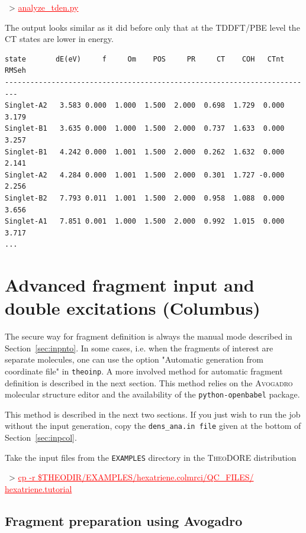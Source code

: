 \documentclass[DIV=12,headings=normal]{scrartcl}
\newcommand{\redl}[1]{{\textcolor{red}{\underline{#1}}}}
\newcommand{\comm}[1]{
\small
~> \redl{#1}
\normalsize
}
\newcommand{\theo}{\textsc{TheoDORE}}
\begin{document}
\comm{analyze\_tden.py}

The output looks similar as it did before only that at the TDDFT/PBE level the CT states are lower in energy.

\scriptsize
\begin{Verbatim}[commandchars=\\\{\}]
state       dE(eV)     f     Om    POS     PR     CT    COH   CTnt  RMSeh
-------------------------------------------------------------------------
Singlet-A2   3.583 0.000  1.000  1.500  2.000  0.698  1.729  0.000  3.179
Singlet-B1   3.635 0.000  1.000  1.500  2.000  0.737  1.633  0.000  3.257
Singlet-B1   4.242 0.000  1.001  1.500  2.000  0.262  1.632  0.000  2.141
Singlet-A2   4.284 0.000  1.001  1.500  2.000  0.301  1.727 -0.000  2.256
Singlet-B2   7.793 0.011  1.001  1.500  2.000  0.958  1.088  0.000  3.656
Singlet-A1   7.851 0.001  1.000  1.500  2.000  0.992  1.015  0.000  3.717
...
\end{Verbatim}
\normalsize

\clearpage
\section{Advanced fragment input and double excitations (Columbus)}
\label{sec:advinp}

The secure way for fragment definition is always the manual mode described in Section~\ref{sec:inpnto}.
In some cases, i.e. when the fragments of interest are separate molecules, one can use the option "Automatic generation from coordinate file" in \texttt{theoinp}.
A more involved method for automatic fragment definition is described in the next section.
This method relies on the \textsc{Avogadro} molecular structure editor and the availability of the \texttt{python-openbabel} package.

This method is described in the next two sections.
If you just wish to run the job without the input generation, copy the \texttt{dens\_ana.in file} given at the bottom of Section~\ref{sec:inpcol}.

Take the input files from the \texttt{EXAMPLES} directory in the \theo{} distribution

\comm{cp -r \$THEODIR/EXAMPLES/hexatriene.colmrci/QC\_FILES/ hexatriene.tutorial} \\


\clearpage
\subsection{Fragment preparation using Avogadro}
\end{document}
